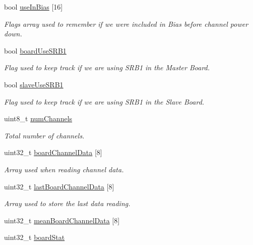 \begin{DoxyCompactItemize}
bool \hyperlink{group___a_d_s1299___library_gaab7b7dca51dd80f61785f355b03b0555}{use\+In\+Bias} \mbox{[}16\mbox{]}
\begin{DoxyCompactList}\small\item\em Flags array used to remember if we were included in Bias before channel power down. \end{DoxyCompactList}\item 
bool \hyperlink{group___a_d_s1299___library_ga1e02fad8a694c8bbfeba493b8be214e4}{board\+Use\+S\+R\+B1}
\begin{DoxyCompactList}\small\item\em Flag used to keep track if we are using S\+R\+B1 in the Master Board. \end{DoxyCompactList}\item 
bool \hyperlink{group___a_d_s1299___library_gab67cf8829f1fda0edfe4fcb89a00f8d1}{slave\+Use\+S\+R\+B1}
\begin{DoxyCompactList}\small\item\em Flag used to keep track if we are using S\+R\+B1 in the Slave Board. \end{DoxyCompactList}\item 
uint8\+\_\+t \hyperlink{group___a_d_s1299___library_gaad6ecaf79af18485d9b015821afee295}{num\+Channels}
\begin{DoxyCompactList}\small\item\em Total number of channels. \end{DoxyCompactList}\item 
uint32\+\_\+t \hyperlink{group___a_d_s1299___library_gad8303f3f7907884aa1ef5727220fd293}{board\+Channel\+Data} \mbox{[}8\mbox{]}
\begin{DoxyCompactList}\small\item\em Array used when reading channel data. \end{DoxyCompactList}\item 
uint32\+\_\+t \hyperlink{group___a_d_s1299___library_ga30b28017ba0fb5095382131d900dbd8e}{last\+Board\+Channel\+Data} \mbox{[}8\mbox{]}
\begin{DoxyCompactList}\small\item\em Array used to store the last data reading. \end{DoxyCompactList}\item 
uint32\+\_\+t \hyperlink{group___a_d_s1299___library_ga4b3ef40d05b115ef45424a733bcbe230}{mean\+Board\+Channel\+Data} \mbox{[}8\mbox{]}
\item 
uint32\+\_\+t \hyperlink{group___a_d_s1299___library_ga50edda929d7766e162d89ec32181a93a}{board\+Stat}

\end{DoxyCompactItemize}
